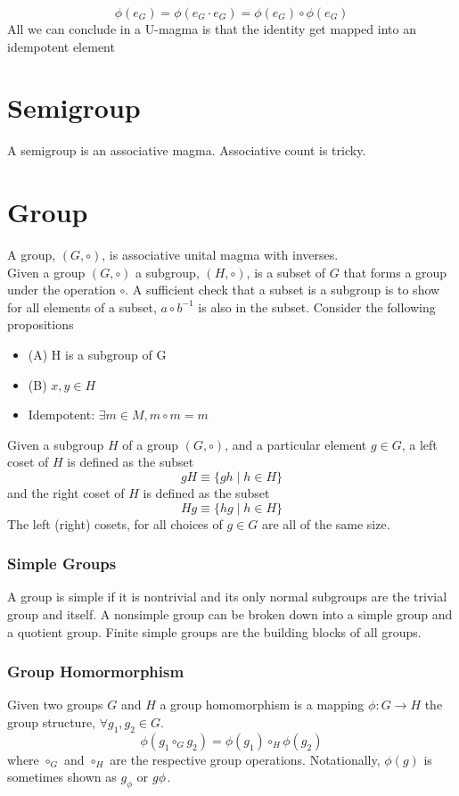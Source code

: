 \documentclass[a4paper]{scrartcl}
\begin{document}
$$\phi(e_{G}) = \phi(e_{G} \cdot e_{G}) = \phi(e_{G}) \circ \phi(e_{G})$$
All we can conclude in a U-magma is that the identity get mapped into an idempotent element





\section{Semigroup}
A semigroup is an associative magma.
Associative count is tricky.

\section{Group}
A group, $(G,\circ)$, is associative unital magma with inverses.\\
Given a group $(G,\circ)$ a subgroup, $(H, \circ)$, is a subset of $G$ that forms a group under the operation $\circ$. A sufficient check that a subset is a subgroup is to show for all elements of a subset, $a\circ b^{-1}$ is also in the subset. Consider the following propositions \\
\begin{itemize}
\item{(A) H is a subgroup of G}
\item{(B) $x,y \in H$}
\item{Idempotent: $\exists m\in M, m\circ m = m$} 
\end{itemize}



Given a subgroup $H$ of a group $(G,\circ)$, and a particular element $g\in G$, a left coset of $H$ is defined as the subset
$$gH\equiv \{ gh \mid h\in H\}$$
and the right coset of $H$ is defined as the subset
$$Hg\equiv \{ hg \mid h\in H\}$$
The left (right) cosets, for all choices of $g\in G$ are all of the same size.



\subsubsection{Simple Groups}
A group is simple if it is nontrivial and its only normal subgroups are the trivial group and itself.
A nonsimple group can be broken down into a simple group and a quotient group. Finite simple groups are the  building blocks of all groups.

\subsubsection{Group Homormorphism}
Given two groups $G$ and $H$ a group homomorphism is a mapping $\phi\colon G\rightarrow H$ the group structure, $\forall g_{1}, g_{2}\in G$.
$$\phi(g_{1} \circ_{G} g_{2}) = \phi(g_{1}) \circ_{H} \phi(g_{2})$$
where $\circ_{G}$ and $\circ_{H}$ are the respective group operations. Notationally, $\phi(g)$ is sometimes shown as $g_{\phi}$ or $g\\ \phi$.\\
\end{document}
